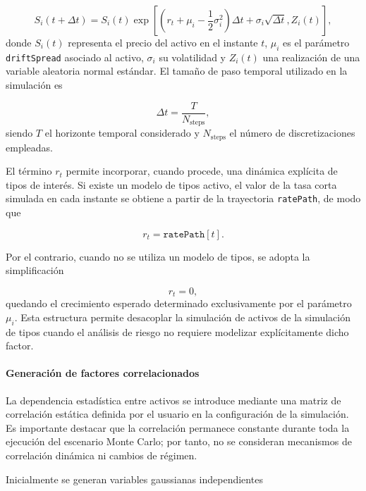 \documentclass[11pt]{article}
\begin{document}
\begin{equation}
S_i(t+\Delta t) =
S_i(t)
\exp
\left[
\left(
r_t + \mu_i - \frac{1}{2}\sigma_i^2
\right)\Delta t
+
\sigma_i\sqrt{\Delta t},Z_i(t)
\right],
\label{eq:gbm_multiasset}
\end{equation}
donde $S_i(t)$ representa el precio del activo en el instante $t$, $\mu_i$ es el parámetro \texttt{driftSpread} asociado al activo, $\sigma_i$ su volatilidad y $Z_i(t)$ una realización de una variable aleatoria normal estándar. El tamaño de paso temporal utilizado en la simulación es

\begin{equation}
\Delta t = \frac{T}{N_{\text{steps}}},
\label{eq:Deltat}
\end{equation}
siendo $T$ el horizonte temporal considerado y $N_{\text{steps}}$ el número de discretizaciones empleadas.

El término $r_t$ permite incorporar, cuando procede, una dinámica explícita de tipos de interés. Si existe un modelo de tipos activo, el valor de la tasa corta simulada en cada instante se obtiene a partir de la trayectoria \texttt{ratePath}, de modo que

\begin{equation}
r_t = \texttt{ratePath}[t].
\end{equation}

Por el contrario, cuando no se utiliza un modelo de tipos, se adopta la simplificación

\begin{equation}
r_t = 0,
\end{equation}
quedando el crecimiento esperado determinado exclusivamente por el parámetro $\mu_i$. Esta estructura permite desacoplar la simulación de activos de la simulación de tipos cuando el análisis de riesgo no requiere modelizar explícitamente dicho factor.

\paragraph{Generación de factores correlacionados}

La dependencia estadística entre activos se introduce mediante una matriz de correlación estática definida por el usuario en la configuración de la simulación. Es importante destacar que la correlación permanece constante durante toda la ejecución del escenario Monte Carlo; por tanto, no se consideran mecanismos de correlación dinámica ni cambios de régimen.

Inicialmente se generan variables gaussianas independientes
\end{document}

